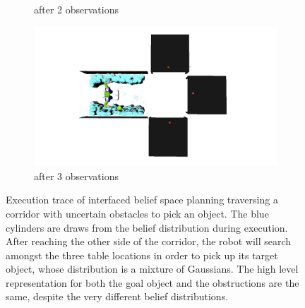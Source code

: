 \begin{figure}
\begin{subfigure}[b]{0.22\linewidth}
    \caption{after 2 observations}
    \label{fig:step3}
  \end{subfigure}
  \begin{subfigure}[b]{0.22\linewidth}
    \includegraphics[width=\textwidth]{corridor_images/3-observe.png}
    \caption{after 3 observations}
    \label{fig:step4}
  \end{subfigure}
  \caption{Execution trace of interfaced belief space planning
    traversing a corridor with uncertain obstacles to pick an
    object. The blue cylinders are draws from the belief distribution
    during execution. After reaching the other side of the corridor,
    the robot will search amongst the three table locations in order
    to pick up its target object, whose distribution is a mixture of
    Gaussians. The high level representation for both the goal object
    and the obstructions are the same, despite the very different
    belief distributions.}
  \label{fig:experiment}
\end{figure}

